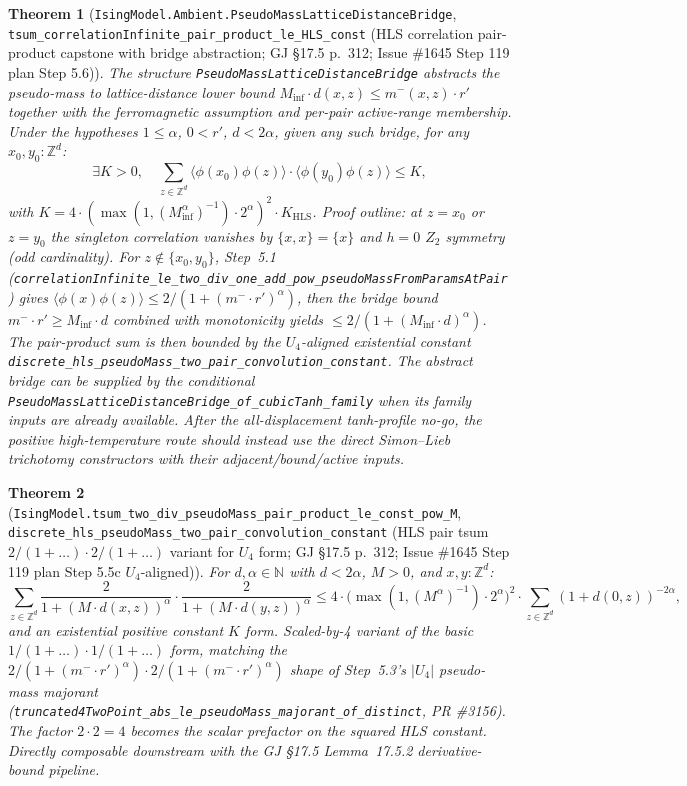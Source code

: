 \documentclass[a4paper,11pt]{article}
\newtheorem{theorem}{Theorem}
\begin{document}
\begin{theorem}[\texttt{IsingModel.Ambient.PseudoMassLatticeDistanceBridge},
\texttt{tsum\_correlationInfinite\_pair\_product\_le\_HLS\_const}
(HLS correlation pair-product capstone with bridge abstraction;
GJ \S17.5 p.~312; Issue \#1645 Step 119 plan Step 5.6)]
The structure \texttt{PseudoMassLatticeDistanceBridge} abstracts the
pseudo-mass to lattice-distance lower bound
$M_{\inf}\cdot d(x,z) \le m^-(x,z)\cdot r'$ together with the ferromagnetic
assumption and per-pair active-range membership. Under the hypotheses
$1 \le \alpha$, $0 < r'$, $d < 2\alpha$, given any such bridge,
for any $x_0, y_0 : \mathbb{Z}^d$:
\[
  \exists K > 0,\quad \sum_{z \in \mathbb{Z}^d}
    \langle \phi(x_0)\phi(z)\rangle\cdot\langle \phi(y_0)\phi(z)\rangle
  \le K,
\]
with $K = 4 \cdot (\max(1, (M_{\inf}^\alpha)^{-1})\cdot 2^\alpha)^2 \cdot K_{\mathrm{HLS}}$.
Proof outline: at $z = x_0$ or $z = y_0$ the singleton correlation vanishes by
$\{x, x\} = \{x\}$ and $h = 0$ $Z_2$ symmetry (odd cardinality). For
$z \notin \{x_0, y_0\}$, Step~5.1
(\texttt{correlationInfinite\_le\_two\_div\_one\_add\_pow\_pseudoMassFromParamsAtPair})
gives $\langle\phi(x)\phi(z)\rangle \le 2/(1+(m^-\cdot r')^\alpha)$, then the
bridge bound $m^-\cdot r' \ge M_{\inf}\cdot d$ combined with monotonicity yields
$\le 2/(1+(M_{\inf}\cdot d)^\alpha)$. The pair-product sum is then bounded by
the $U_4$-aligned existential constant
\texttt{discrete\_hls\_pseudoMass\_two\_pair\_convolution\_constant}.
The abstract bridge can be supplied by the conditional
\texttt{PseudoMassLatticeDistanceBridge\_of\_cubicTanh\_family} when its family
inputs are already available.  After the all-displacement tanh-profile no-go,
the positive high-temperature route should instead use the direct Simon--Lieb
trichotomy constructors with their adjacent/bound/active inputs.
\end{theorem}

\begin{theorem}[\texttt{IsingModel.tsum\_two\_div\_pseudoMass\_pair\_product\_le\_const\_pow\_M},
\texttt{discrete\_hls\_pseudoMass\_two\_pair\_convolution\_constant}
(HLS pair tsum $2/(1+\ldots)\cdot 2/(1+\ldots)$ variant for $U_4$ form;
GJ \S17.5 p.~312; Issue \#1645 Step 119 plan Step 5.5c $U_4$-aligned)]
For $d, \alpha \in \mathbb{N}$ with $d < 2\alpha$, $M > 0$, and
$x, y : \mathbb{Z}^d$:
\[
  \sum_{z \in \mathbb{Z}^d}
    \frac{2}{1+(M\cdot d(x,z))^\alpha}\cdot\frac{2}{1+(M\cdot d(y,z))^\alpha}
  \le 4 \cdot \bigl(\max(1, (M^\alpha)^{-1})\cdot 2^\alpha\bigr)^2
      \cdot \sum_{z \in \mathbb{Z}^d} (1 + d(0, z))^{-2\alpha},
\]
and an existential positive constant $K$ form. Scaled-by-4 variant of the
basic $1/(1+\ldots)\cdot 1/(1+\ldots)$ form, matching the
$2/(1+(m^-\cdot r')^\alpha)\cdot 2/(1+(m^-\cdot r')^\alpha)$ shape of
Step~5.3's $|U_4|$ pseudo-mass majorant
(\texttt{truncated4TwoPoint\_abs\_le\_pseudoMass\_majorant\_of\_distinct}, PR \#3156).
The factor $2\cdot 2 = 4$ becomes the scalar prefactor on the squared HLS
constant. Directly composable downstream with the GJ \S17.5 Lemma~17.5.2
derivative-bound pipeline.
\end{theorem}
\end{document}
